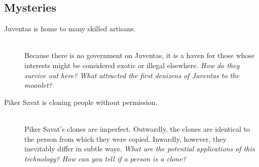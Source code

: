 \documentclass[11pt, a5paper, parskip=half-, DIV=12]{scrartcl}
\begin{document}
\subsection*{Mysteries}
\begin{description}
	\item[Juventas is home to many skilled artisans.] \phantom{} \\ Because there is no government on Juventas, it is a haven for those whose interests might be considered exotic or illegal elsewhere.  \textit{ How do they survive out here? What attracted the first denizens of Juventas to the moonlet?}
	\item[Piker Savat is cloning people without permission.] \phantom{} \\
	Piker Savat's clones are imperfect. Outwardly, the clones are identical to the person from which they were copied. Inwardly, however, they inevitably differ in subtle ways. \textit{What are the potential applications of this technology? How can you tell if a person is a clone?}
\end{description}

\newpage



\newpage

\thispagestyle{empty}
\end{document}
